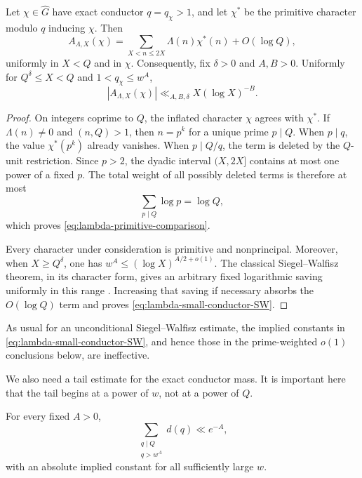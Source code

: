 \begin{lemma}
\label{lem:lambda-primitive-comparison}
Let $\chi\in\widehat G$ have exact conductor $q=q_\chi>1$, and let
$\chi^*$ be the primitive character modulo $q$ inducing $\chi$.  Then
\begin{equation}
 A_{\Lambda,X}(\chi)
 =\sum_{X<n\le2X}\Lambda(n)\chi^*(n)+O(\log Q),
 \label{eq:lambda-primitive-comparison}
\end{equation}
uniformly in $X<Q$ and in $\chi$.  Consequently, fix $\delta>0$ and
$A,B>0$.  Uniformly for $Q^\delta\le X<Q$ and
$1<q_\chi\le w^A$,
\begin{equation}
 |A_{\Lambda,X}(\chi)|
 \ll_{A,B,\delta}X(\log X)^{-B}.
 \label{eq:lambda-small-conductor-SW}
\end{equation}
\end{lemma}

\begin{proof}
On integers coprime to $Q$, the inflated character $\chi$ agrees with
$\chi^*$.  If $\Lambda(n)\ne0$ and $(n,Q)>1$, then $n=p^k$ for a unique
prime $p\mid Q$.  When $p\mid q$, the value $\chi^*(p^k)$ already vanishes.
When $p\mid Q/q$, the term is deleted by the $Q$-unit restriction.  Since
$p>2$, the dyadic interval $(X,2X]$ contains at most one power of a fixed
$p$.  The total weight of all possibly deleted terms is therefore at most
\[
 \sum_{p\mid Q}\log p=\log Q,
\]
which proves \eqref{eq:lambda-primitive-comparison}.

Every character under consideration is primitive and nonprincipal.  Moreover,
when $X\ge Q^\delta$, one has
$w^A\le(\log X)^{A/2+o(1)}$.  The classical Siegel--Walfisz theorem, in its
character form, gives an arbitrary fixed logarithmic saving uniformly in this
range \citep{Siegel1935,Walfisz1936,IwaniecKowalski2004}.  Increasing that
saving if necessary absorbs the $O(\log Q)$ term and proves
\eqref{eq:lambda-small-conductor-SW}.
\end{proof}

As usual for an unconditional Siegel--Walfisz estimate, the implied constants
in \eqref{eq:lambda-small-conductor-SW}, and hence those in the prime-weighted
$o(1)$ conclusions below, are ineffective.

We also need a tail estimate for the exact conductor mass.  It is important
here that the tail begins at a power of $w$, not at a power of $Q$.

\begin{lemma}
\label{lem:lambda-polylog-conductor-tail}
For every fixed $A>0$,
\begin{equation}
 \sum_{\substack{q\mid Q\\q>w^A}}d(q)\ll e^{-A},
 \label{eq:lambda-polylog-conductor-tail}
\end{equation}
with an absolute implied constant for all sufficiently large $w$.
\end{lemma}

